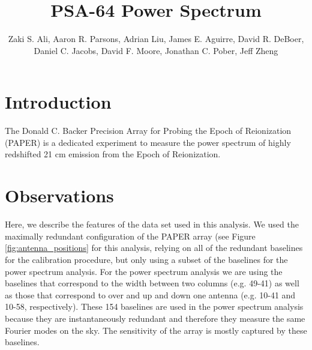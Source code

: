\documentclass[twocolumn,numberedappendix]{emulateapj}
\begin{document}
\title{PSA-64 Power Spectrum}

\author{
Zaki S. Ali,
Aaron R. Parsons,
Adrian Liu,
James E. Aguirre,
David R. DeBoer,
Daniel C. Jacobs,
David F. Moore,
Jonathan C. Pober,
Jeff Zheng
}


\begin{abstract}
\end{abstract}


\section{Introduction}
The Donald C. Backer Precision Array for Probing the Epoch of Reionization
(PAPER) is a dedicated experiment to measure the power spectrum of highly
redshifted 21 cm emission from the Epoch of Reionization.





\section{Observations}
Here, we describe the features of the data set used in this analysis. 
We used the maximally redundant configuration of the PAPER array (see Figure
\ref{fig:antenna_positions} for this analysis, relying on all of the redundant
baselines for the calibration procedure, but only using a subset of the
baselines for the power spectrum analysis. For the power spectrum analysis we
are using the baselines that correspond to the width between two columns (e.g.
49-41) as well as those that correspond to over and up and down one antenna
(e.g. 10-41 and 10-58, respectively). These 154 baselines are used in the power
spectrum analysis because they are instantaneously redundant and therefore they
measure the same Fourier modes on the sky. The sensitivity of the array is mostly
captured by these baselines. 
\end{document}
